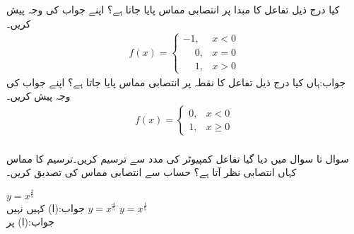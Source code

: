 کیا درج ذیل تفاعل کا مبدا پر انتصابی مماس پایا جاتا ہے؟ اپنے جواب کی وجہ پیش کریں۔
\begin{align*}
f(x)=
\begin{cases}
-1,&x<0\\
\phantom{-}0,&x=0\\
\phantom{-}1,&x>0
\end{cases}
\end{align*}
جواب:\quad ہاں
کیا درج ذیل تفاعل کا نقطہ  پر انتصابی مماس پایا جاتا ہے؟ اپنے جواب کی وجہ پیش کریں۔
\begin{align*}
f(x)=
\begin{cases}
0,&x<0\\
1,&x\ge 0
\end{cases}
\end{align*}
\\
سوال  تا سوال  میں دیا گیا تفاعل کمپیوٹر کی مدد سے  ترسیم کریں۔ترسیم کا مماس کہاں انتصابی نظر آتا ہے؟ حساب سے انتصابی مماس کی تصدیق کریں۔

$y=x^{\tfrac{2}{5}}$\\
جواب:\quad (ا) کہیں نہیں
$y=x^{\tfrac{4}{5}}$
$y=x^{\tfrac{1}{5}}$\\
جواب:\quad (ا)  پر


